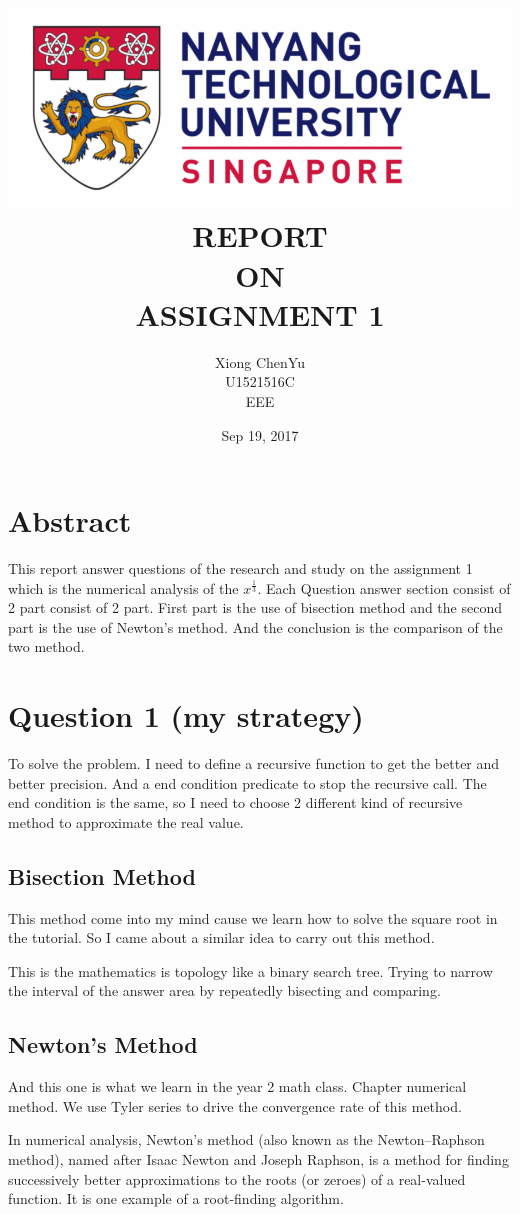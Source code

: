 \documentclass[setspace, doublespace]{scrartcl}
\author{Xiong ChenYu \\
U1521516C \\
EEE \\
}
\date{Sep 19, 2017 \\
}
\title{\includegraphics[width=\textwidth]{img/NTU.png} \\
[3\baselineskip] REPORT \\
ON \\
ASSIGNMENT 1 \\
[5\baselineskip]}
\begin{document}
\maketitle
\tableofcontents

\newpage
\section{Abstract}
\label{sec:orgf6d0c21}
This report answer questions of the research and study on the assignment 1
which is the numerical analysis of the \(x^{\frac{1}{3}}\). Each
Question answer section consist of 2 part consist of 2 part. First part is the
use of bisection method and the second part is the use of Newton's method. And
the conclusion is the comparison of the two method.

\newpage
\section{Question 1 (my strategy)}
\label{sec:org611d34d}
To solve the problem. I need to define a recursive function to get the better
and better precision. And a end condition predicate to stop the recursive call.
The end condition is the same, so I need to choose 2 different kind of
recursive method to approximate the real value.

\subsection{Bisection Method}
\label{sec:orgf0e7c24}
This method come into my mind cause we learn how to solve the square root in
the tutorial. So I came about a similar idea to carry out this method.

This is the mathematics is topology like a binary search tree. Trying to
narrow the interval of the answer area by repeatedly bisecting and comparing.

\subsection{Newton's Method}
\label{sec:org94941a1}
And this one is what we learn in the year 2 math class. Chapter numerical
method. We use Tyler series to drive the convergence rate of this method.

In numerical analysis, Newton's method (also known as the Newton–Raphson
method), named after Isaac Newton and Joseph Raphson, is a method for finding
successively better approximations to the roots (or zeroes) of a real-valued
function. It is one example of a root-finding algorithm.
\end{document}
